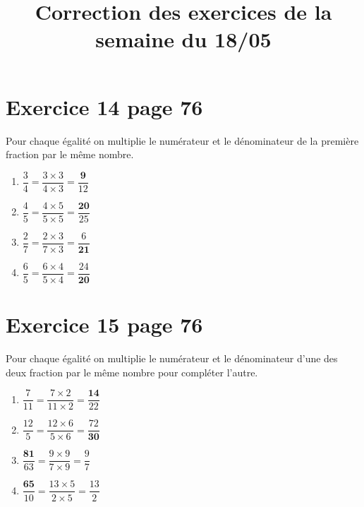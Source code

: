 \documentclass[12pt,a4paper]{article}
\title{Correction des exercices de la semaine du 18/05}
\date{}
\begin{document}
	
\maketitle

\vspace*{-1cm}

\section*{Exercice 14 page 76}

Pour chaque égalité on multiplie le numérateur et le dénominateur de la première fraction par le même nombre.
\begin{multicols}{2}


\begin{enumerate}
	\item $\dfrac{3}{4} = \dfrac{3 \times 3}{4 \times 3} = \dfrac{\mathbf{9}}{12}$ 
	\item $\dfrac{4}{5} = \dfrac{4 \times 5}{5 \times 5} = \dfrac{\mathbf{20}}{25}$ 
	\item $\dfrac{2}{7} = \dfrac{2 \times 3}{7 \times 3} = \dfrac{6}{\mathbf{21}}$ 
	\item $\dfrac{6}{5} = \dfrac{6 \times 4}{5 \times 4} = \dfrac{24}{\mathbf{20}}$ 
\end{enumerate}

\end{multicols}


\section*{Exercice 15 page 76}

Pour chaque égalité on multiplie le numérateur et le dénominateur d'une des deux fraction par le même nombre pour compléter l'autre.
\begin{multicols}{2}
	
	
	\begin{enumerate}
		\item $\dfrac{7}{11} = \dfrac{7 \times 2}{11 \times 2} = \dfrac{\mathbf{14}}{22}$ 
		\item $\dfrac{12}{5} = \dfrac{12 \times 6}{5 \times 6} = \dfrac{72}{\mathbf{30}}$
		\item $\dfrac{\mathbf{81}}{63} = \dfrac{9 \times 9}{7 \times 9} =\dfrac{9}{7}$ 
		\item $\dfrac{\mathbf{65}}{10} = \dfrac{13 \times 5}{2 \times 5} = \dfrac{13}{2}$ %
	\end{enumerate}
	
\end{multicols}
\end{document}
